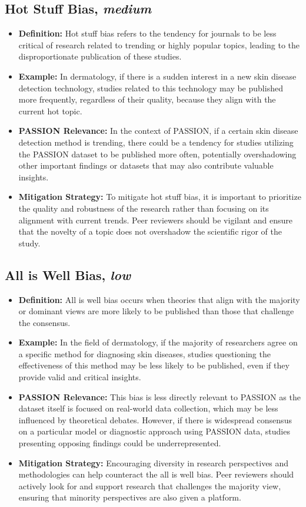 \begin{refsection}
	\subsection{Hot Stuff Bias, \textit{medium}}
	\begin{itemize}
		\item \textbf{Definition:} Hot stuff bias refers to the tendency for journals to be less critical of research related to trending or highly popular topics, leading to the disproportionate publication of these studies.
		\item \textbf{Example:} In dermatology, if there is a sudden interest in a new skin disease detection technology, studies related to this technology may be published more frequently, regardless of their quality, because they align with the current hot topic.
		\item \textbf{PASSION Relevance:} In the context of PASSION, if a certain skin disease detection method is trending, there could be a tendency for studies utilizing the PASSION dataset to be published more often, potentially overshadowing other important findings or datasets that may also contribute valuable insights.
		\item \textbf{Mitigation Strategy:} To mitigate hot stuff bias, it is important to prioritize the quality and robustness of the research rather than focusing on its alignment with current trends. Peer reviewers should be vigilant and ensure that the novelty of a topic does not overshadow the scientific rigor of the study.
	\end{itemize}
	
	\subsection{All is Well Bias, \textit{low}}
	\begin{itemize}
		\item \textbf{Definition:} All is well bias occurs when theories that align with the majority or dominant views are more likely to be published than those that challenge the consensus.
		\item \textbf{Example:} In the field of dermatology, if the majority of researchers agree on a specific method for diagnosing skin diseases, studies questioning the effectiveness of this method may be less likely to be published, even if they provide valid and critical insights.
		\item \textbf{PASSION Relevance:} This bias is less directly relevant to PASSION as the dataset itself is focused on real-world data collection, which may be less influenced by theoretical debates. However, if there is widespread consensus on a particular model or diagnostic approach using PASSION data, studies presenting opposing findings could be underrepresented.
		\item \textbf{Mitigation Strategy:} Encouraging diversity in research perspectives and methodologies can help counteract the all is well bias. Peer reviewers should actively look for and support research that challenges the majority view, ensuring that minority perspectives are also given a platform.
	\end{itemize}
	

\end{refsection}
